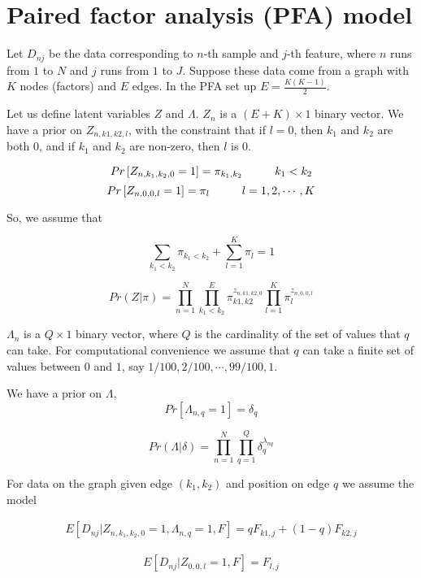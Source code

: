 \documentclass[12pt]{article}
\begin{document}
\section{Paired factor analysis (PFA) model}

Let $D_{nj}$ be the data corresponding to $n$-th sample and $j$-th feature, 
where $n$ runs from $1$ to $N$ and $j$ runs from $1$ to $J$.  
Suppose these data come from a graph with $K$ nodes (factors) and $E$ edges. In the
PFA set up $E=\frac{K(K-1)}{2}$.

Let us define latent variables $Z$ and $\Lambda$. $Z_{n}$ is a $(E+K)
\times 1$ binary vector. We have a prior on $Z_{n,k1,k2,l}$, with the constraint that if $l=0$, then $k_1$ and $k_2$ are both $0$, and if $k_1$ and $k_2$ are non-zero, then $l$ is 0.

$$ Pr \left [ Z_{n, k_1, k_2, 0} = 1 \right ] = \pi_{k_1,k_2} \hspace{1 cm} k_1 < k_2$$
$$ Pr \left [ Z_{n, 0, 0, l} = 1 \right ] = \pi_{l} \hspace{1 cm} l=1,2, \cdots, K$$

So, we assume that 

$$ \sum_{k_1 < k_2} \pi_{k_1 < k_2} + \sum_{l=1}^{K} \pi_{l} = 1 $$

$$  Pr (Z |  \pi )  = \prod_{n=1}^{N} \prod_{k_1 < k_2}^E \pi_{k1,k2}^{z_{n,k1,k2,0}} \prod_{l=1}^{K} \pi_{l}^{z_{n,0,0,l}} $$

$\Lambda_{n}$ is a $Q \times 1$ binary vector, where $Q$ is the cardinality of the set of values that $q$ can take.
For computational convenience we assume that $q$ can take a finite set of values between $0$ and $1$, 
say $1/100, 2/100, \cdots, 99/100, 1$.

We have a prior on  $\Lambda$,
$$ Pr \left [ \Lambda_{n, q} = 1 \right ] = \delta_{q}  $$

$$  Pr (\Lambda | \delta ) = \prod_{n=1}^{N} \prod_{q=1}^{Q} \delta_{q}^{\lambda_{nq}} $$

For data on the graph given edge $(k_1, k_2)$ and position on edge $q$ we assume the model 

\begin{eqnarray}
 E \left [ D_{nj} | Z_{n, k_1, k_2, 0} = 1, \Lambda_{n,q}=1, F \right] = q F_{k1,j} + (1-q) F_{k2,j}
\end{eqnarray}

\begin{eqnarray}
 E \left [ D_{nj} | Z_{0, 0, l} = 1, F \right] =  F_{l,j} 
\end{eqnarray}
\end{document}
